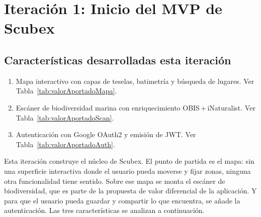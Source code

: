 \chapter{Iteración 1: Inicio del MVP de Scubex}

\begin{abstract}
Esta iteración entrega parte del MVP funcional de Scubex: el mapa interactivo 
con escáner de biodiversidad marina y autenticación con Google.\end{abstract}

\section{Características desarrolladas esta iteración}

\begin{enumerate}
\item Mapa interactivo con capas de teselas, batimetría y búsqueda de lugares. Ver Tabla~\ref{tab:valorAportadoMapa}.
\item Escáner de biodiversidad marina con enriquecimiento OBIS\,+\,iNaturalist. Ver Tabla~\ref{tab:valorAportadoScan}.
\item Autenticación con Google OAuth2 y emisión de JWT. Ver Tabla~\ref{tab:valorAportadoAuth}.
\end{enumerate}

Esta iteración construye el núcleo de Scubex. El punto de partida es el mapa: sin una superficie interactiva donde el usuario pueda moverse y fijar zonas, ninguna otra funcionalidad tiene sentido. Sobre ese mapa se monta el escáner de biodiversidad, que es parte de la propuesta de valor diferencial de la aplicación. Y para que el usuario pueda guardar y compartir lo que encuentra, se añade la autenticación. Las tres características se analizan a continuación.

